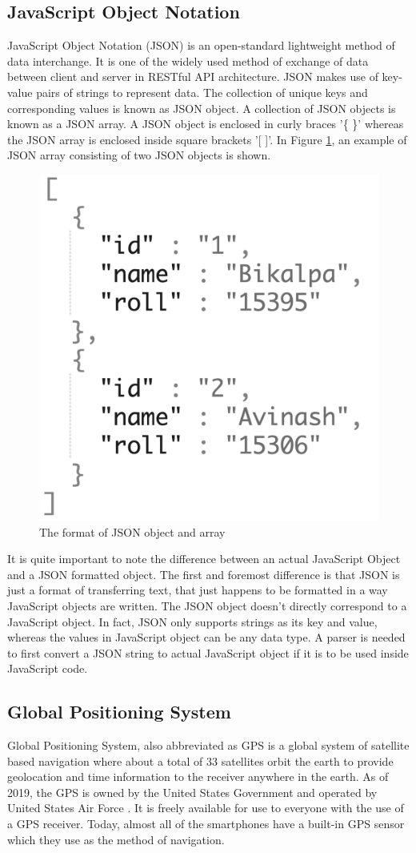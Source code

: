\documentclass[12pt, a4paper, oneside]{article}
\begin{document}
\subsection{JavaScript Object Notation}
JavaScript Object Notation (JSON) is an open-standard lightweight method of data interchange. It is one of the widely used method of exchange of data between client and server in RESTful API architecture. JSON makes use of key-value pairs of strings to represent data. The collection of unique keys and corresponding values is known as JSON object. A collection of JSON objects is known as a JSON array. A JSON object is enclosed in curly braces '\{ \}' whereas the JSON array is enclosed inside square brackets '[ ]'. In Figure \ref{fig:json}, an example of JSON array consisting of two JSON objects is shown.


\begin{figure}[H]
	\includegraphics[width=0.3\linewidth]{json.png}
	\centering
	\caption{The format of JSON object and array}
	\label{fig:json}
\end{figure}

It is quite important to note the difference between an actual JavaScript Object and a JSON formatted object. The first and foremost difference is that JSON is just a format of transferring text, that just happens to be formatted in a way JavaScript objects are written. The JSON object doesn't directly correspond to a JavaScript object. In fact, JSON only supports strings as its key and value, whereas the values in JavaScript object can be any data type. A parser is needed to first convert a JSON string to actual JavaScript object if it is to be used inside JavaScript code.

\subsection{Global Positioning System}
Global Positioning System, also abbreviated as GPS is a global system of satellite based navigation where about a total of 33 satellites orbit the earth to provide geolocation and time information to the receiver anywhere in the earth. As of 2019, the GPS is owned by the United States Government and operated by United States Air Force \cite{gps}. It is freely available for use to everyone with the use of a GPS receiver. Today, almost all of the smartphones have a built-in GPS sensor which they use as the method of navigation.
\end{document}
